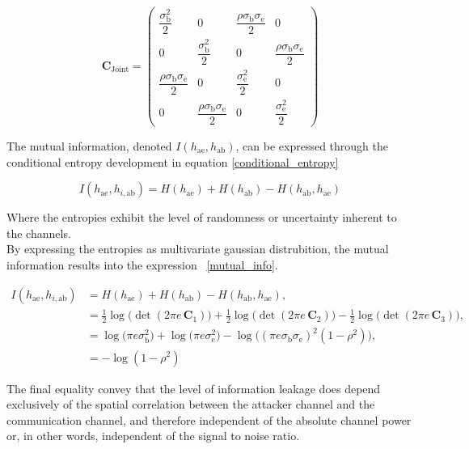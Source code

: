 \begin{equation}
\mathbf{C}_{\text{Joint}} =
    \begin{pmatrix}
    \dfrac{\sigma^2_{\text{b}}}{2} & 0 & \dfrac{\rho\sigma_{\text{b}}\sigma_{\text{e}}}{2} & 0\\[6pt]
    0 & \dfrac{\sigma^2_{\text{b}}}{2} & 0 & \dfrac{\rho\sigma_{\text{b}}\sigma_{\text{e}}}{2}\\[6pt]
    \dfrac{\rho\sigma_{\text{b}}\sigma_{\text{e}}}{2} & 0 & \dfrac{\sigma^2_{\text{e}}}{2} & 0\\[6pt]
    0 & \dfrac{\rho\sigma_{\text{b}}\sigma_{\text{e}}}{2} & 0 & \dfrac{\sigma^2_{\text{e}}}{2}
    \end{pmatrix}
\label{covariance_joint}
\end{equation}

The mutual information, denoted $I(h_{\mathrm{ae}},h_{\mathrm{ab}})$, can be expressed through the conditional entropy development in equation \ref{conditional_entropy}

\begin{equation}
I(h_{\mathrm{ae}},h_{i,\mathrm{ab}}) = H(h_{\mathrm{ae}}) + H(h_{\mathrm{ab}}) - H(h_{\mathrm{ab}},h_{\mathrm{ae}})
\label{conditional_entropy}
\end{equation}

Where the entropies exhibit the level of randomness or uncertainty inherent to the channels.\\
By expressing the entropies as multivariate gaussian distrubition, the mutual information results into the expression ~\ref{mutual_info}.

\begin{align}
I(h_{\mathrm{ae}},h_{i,\mathrm{ab}}) &= H(h_{\mathrm{ae}}) + H(h_{\mathrm{ab}}) - H(h_{\mathrm{ab}},h_{\mathrm{ae}}),\\
&= \frac{1}{2}\log\!\bigl(\det(2\pi e\,\mathbf{C}_1)\bigr) + \frac{1}{2}\log\!\bigl(\det(2\pi e\,\mathbf{C}_2)\bigr) - \frac{1}{2}\log\!\bigl(\det(2\pi e\,\mathbf{C}_3)\bigr),\\
&= \log\!\bigl(\pi e\sigma^2_\text{b}\bigr) + \log\!\bigl(\pi e\sigma^2_\text{e}\bigr) - \log\!\bigl((\pi e\sigma_\text{b}\sigma_\text{e})^2(1-\rho^2)\bigr),\\
&= - \log\!(1-\rho^2)
\label{mutual_info}
\end{align}

The final equality convey that the level of information leakage does depend exclusively of the spatial correlation between the attacker channel and the communication channel, and therefore independent of the absolute channel power or, in other words, independent of the signal to noise ratio.


